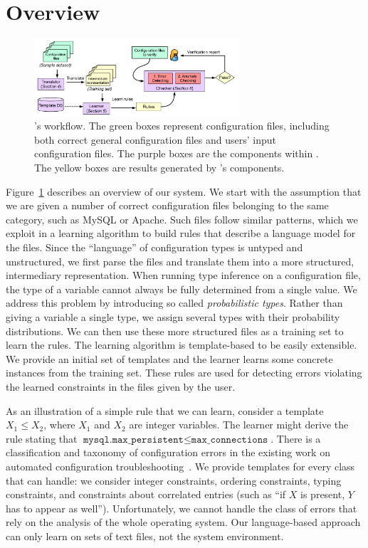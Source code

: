 
\section{\app Overview}

\begin{figure}[tbp] \centering
\includegraphics[width=0.68\textwidth]{figs/overview}
\caption{{\footnotesize \app's workflow. The green boxes represent configuration files,
  including both correct general configuration files and users' input
  configuration files. The purple boxes are the components within \app.
  The yellow boxes are results generated by \app's components.}}
\label{fig-overview}
\end{figure}

Figure~\ref{fig-overview} describes an overview of our system. We start
with the assumption that we are given a number of correct configuration
files belonging to the same category, such as MySQL or Apache. 
Such files follow similar patterns, which we exploit
in a learning algorithm to build rules that
describe a language model for the files. Since the
``language'' of configuration types is untyped and unstructured, we
first parse the files and translate them into a more structured,
intermediary representation.
When running type inference on a configuration file, 
the type of a variable cannot always be fully determined from 
a single value.
We address this problem 
by introducing so called {\emph{probabilistic types}}.
Rather than giving a variable a single type, we assign several types with their probability distributions. 
We can then use these more structured files
as a training set to learn the rules. The learning algorithm
is template-based to be easily extensible. We provide an initial set of templates and the
learner learns some concrete instances from the training set. These
rules are used for detecting errors violating the learned constraints
in the files given by the user.

As an 
illustration of a simple rule that we can learn, consider a template
 $X_1 \le X_2$, where $X_1$ and $X_2$ are
integer variables. The learner might derive the rule stating that
$\texttt{mysql.max\_persistent} \le \texttt{max\_connections}$. There is a classification and taxonomy of configuration errors in the 
existing work on automated configuration troubleshooting~\cite{yin11anempirical, configdataset}. We provide templates for every class that \app can handle: we consider integer constraints, ordering
constraints, typing constraints, and constraints about correlated entries (such as ``if $X$ is present, $Y$ has to appear as well''). 
Unfortunately, we cannot handle the class of errors that rely on the analysis of the whole operating system.
Our language-based approach can only learn on sets of text files, not the system environment.



